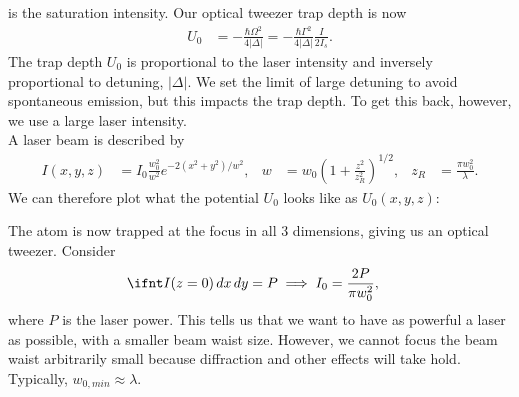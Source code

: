 \documentclass[lasers.tex]{subfiles}
\begin{document}
is the saturation intensity. 
Our optical tweezer trap depth is now
\begin{align}
    U_0 &= -\frac{\hbar\Omega^2}{4|\Delta|} = -\frac{\hbar\Gamma^2}{4|\Delta|}\frac{I}{2I_s}.
\end{align}
The trap depth $U_0$ is proportional to the laser intensity and inversely proportional to detuning, $|\Delta|$.
We set the limit of large detuning to avoid spontaneous emission, but this impacts the trap depth. 
To get this back, however, we use a large laser intensity. \\
A laser beam is described by
\begin{align}
    I(x,y,z) &= I_0\frac{w_0^2}{w^2}e^{-2(x^2+y^2)/w^2}, & w &= w_0\left(1+\frac{z^2}{z_R^2}\right)^{1/2}, & z_R &= \frac{\pi w_0^2}{\lambda}.
\end{align}
We can therefore plot what the potential $U_0$ looks like as $U_0(x,y,z)$:
\begin{figure}[H]
    \centering
\end{figure}
The atom is now trapped at the focus in all 3 dimensions, giving us an optical tweezer.
Consider
\begin{align}
    \ifnt I(z=0)\,dx\,dy &= P \implies I_0 = \frac{2P}{\pi w_0^2},
\end{align}
where $P$ is the laser power. 
This tells us that we want to have as powerful a laser as possible, with a smaller beam waist size. 
However, we cannot focus the beam waist arbitrarily small because diffraction and other effects will take hold. 
Typically, $w_{0,min}\approx \lambda$.
\end{document}

